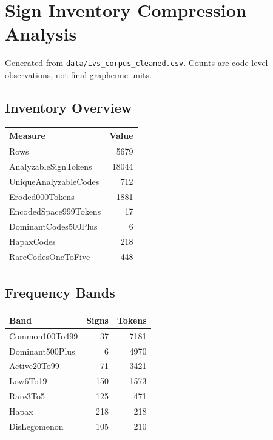 ﻿\documentclass[11pt,a4paper]{article}
\begin{document}
\section*{Sign Inventory Compression Analysis}

Generated from \texttt{data/ivs\_corpus\_cleaned.csv}. Counts are code-level observations, not final graphemic units.

\subsection*{Inventory Overview}
\begin{center}
\begin{tabular}{lr}
\toprule
\textbf{Measure} & \textbf{Value} \\
\midrule
Rows & 5679 \\
AnalyzableSignTokens & 18044 \\
UniqueAnalyzableCodes & 712 \\
Eroded000Tokens & 1881 \\
EncodedSpace999Tokens & 17 \\
DominantCodes500Plus & 6 \\
HapaxCodes & 218 \\
RareCodesOneToFive & 448 \\
\bottomrule
\end{tabular}
\end{center}

\subsection*{Frequency Bands}
\begin{center}
\begin{tabular}{lrr}
\toprule
\textbf{Band} & \textbf{Signs} & \textbf{Tokens} \\
\midrule
Common100To499 & 37 & 7181 \\
Dominant500Plus & 6 & 4970 \\
Active20To99 & 71 & 3421 \\
Low6To19 & 150 & 1573 \\
Rare3To5 & 125 & 471 \\
Hapax & 218 & 218 \\
DisLegomenon & 105 & 210 \\
\bottomrule
\end{tabular}
\end{center}
\end{document}
